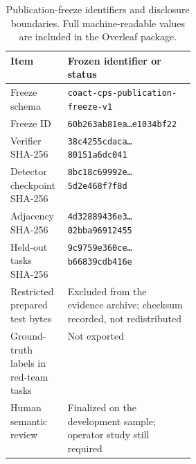 \begin{table}[t]
\centering
\caption{Publication-freeze identifiers and disclosure boundaries. Full machine-readable values are included in the Overleaf package.}
\label{tab:reproducibility}
\small
\begin{tabularx}{\linewidth}{@{}p{0.31\linewidth}X@{}}
\toprule
Item & Frozen identifier or status \\
\midrule
Freeze schema & \texttt{coact-cps-publication-freeze-v1} \\
Freeze ID & \texttt{60b263ab81ea\ldots e1034bf22} \\
Verifier SHA-256 & \texttt{38c4255cdaca\ldots 80151a6dc041} \\
Detector checkpoint SHA-256 & \texttt{8bc18c69992e\ldots 5d2e468f7f8d} \\
Adjacency SHA-256 & \texttt{4d32889436e3\ldots 02bba96912455} \\
Held-out tasks SHA-256 & \texttt{9c9759e360ce\ldots b66839cdb416e} \\
Restricted prepared test bytes & Excluded from the evidence archive; checksum recorded, not redistributed \\
Ground-truth labels in red-team tasks & Not exported \\
Human semantic review & Finalized on the development sample; operator study still required \\
\bottomrule
\end{tabularx}
\end{table}
